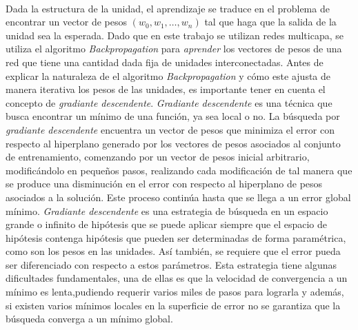 \paragraph{}Dada la estructura de la unidad, el aprendizaje se traduce en el problema de encontrar un vector de pesos $(w_0,w_1,\dots,w_n)$ tal que haga que la salida de la unidad sea la esperada. Dado que en este trabajo se utilizan redes multicapa, se utiliza el algoritmo \textit{Backpropagation} para \textit{aprender} los vectores de pesos de una red que tiene una cantidad dada fija de unidades interconectadas. Antes de explicar la naturaleza de el algoritmo \textit{Backpropagation} y cómo este ajusta de manera iterativa los pesos de las unidades, es importante tener en cuenta el concepto de \textit{gradiante descendente}. \textit{Gradiante descendente} es una técnica que busca encontrar un mínimo de una función, ya sea local o no. La búsqueda por \textit{gradiante descendente} encuentra un vector de pesos que minimiza el error con respecto al hiperplano generado por los vectores de pesos asociados al conjunto de entrenamiento, comenzando por un vector de pesos inicial arbitrario, modificándolo en pequeños pasos, realizando cada modificación de tal manera que se produce una disminución en el error con respecto al hiperplano de pesos asociados a la solución. Este proceso continúa hasta que se llega a un error global mínimo. \textit{Gradiante descendente} es una estrategia de búsqueda en un espacio grande o infinito de hipótesis que se puede aplicar siempre que el espacio de hipótesis contenga hipótesis que pueden ser determinadas de forma paramétrica, como son los pesos en las unidades. Así también, se requiere que el error pueda ser diferenciado con respecto a estos parámetros. Esta estrategia tiene algunas dificultades fundamentales, una de ellas es que la velocidad de convergencia a un mínimo es lenta,pudiendo requerir varios miles de pasos para lograrla y además, si existen varios mínimos locales en la superficie de error no se garantiza que la búsqueda converga a un mínimo global.

